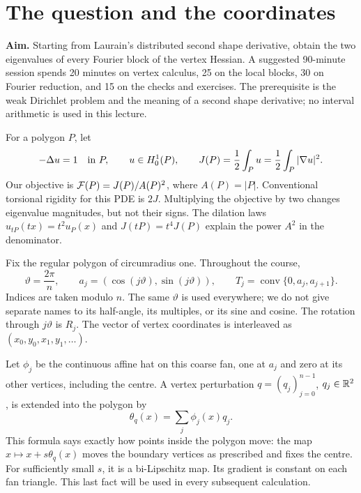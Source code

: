 \section{The question and the coordinates}
\label{l1:setting}
\noindent\textbf{Aim.} Starting from Laurain's distributed second shape
 derivative, obtain the two eigenvalues of every Fourier block of the
 vertex Hessian. A suggested 90-minute session spends 20 minutes on vertex
 calculus, 25 on the local blocks, 30 on Fourier reduction, and 15 on the
 checks and exercises. The prerequisite is the weak Dirichlet problem and
 the meaning of a second shape derivative; no interval arithmetic is used
 in this lecture.

For a polygon $P$, let
\[
 -\Delta u=1\quad\hbox{in }P,\qquad u\in H^1_0(P),\qquad
 J(P)=\frac12\int_Pu=\frac12\int_P|\nabla u|^2.
\]
Our objective is $\mathcal F(P)=J(P)/A(P)^2$, where $A(P)=|P|$.
Conventional torsional rigidity for this PDE is $2J$. Multiplying the
objective by two changes eigenvalue magnitudes, but not their signs.
The dilation laws $u_{tP}(tx)=t^2u_P(x)$ and $J(tP)=t^4J(P)$ explain the
power $A^2$ in the denominator.

Fix the regular polygon of circumradius one. Throughout the course,
\[
 \vartheta=\frac{2\pi}{n},\qquad
 a_j=(\cos(j\vartheta),\sin(j\vartheta)),\qquad
 T_j=\operatorname{conv}\{0,a_j,a_{j+1}\}.
\]
Indices are taken modulo $n$. The same $\vartheta$ is used everywhere;
we do not give separate names to its half-angle, its multiples, or its
sine and cosine. The rotation through $j\vartheta$ is $R_j$.
The vector of vertex coordinates is interleaved as
$(x_0,y_0,x_1,y_1,\ldots)$.

\begin{center}
\end{center}

Let $\phi_j$ be the continuous affine hat on this coarse fan, one at
$a_j$ and zero at its other vertices, including the centre. A vertex
perturbation $q=(q_j)_{j=0}^{n-1}$, $q_j\in\mathbb R^2$, is extended into the
polygon by
\[
 \theta_q(x)=\sum_j\phi_j(x)q_j.
\]
This formula says exactly how points inside the polygon move: the map
$x\mapsto x+s\theta_q(x)$ moves the boundary vertices as prescribed and
fixes the centre. For sufficiently small $s$, it is a bi-Lipschitz map.
Its gradient is constant on each fan triangle. This last fact will be
used in every subsequent calculation.

